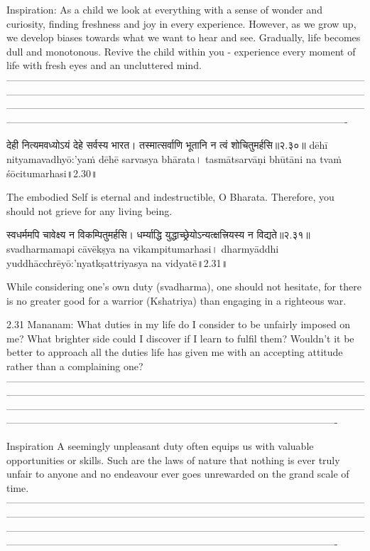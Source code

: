Inspiration:
As a child we look at everything with a sense of wonder and curiosity, finding freshness and joy in every experience. However, as we grow up, we develop biases towards what we want to hear and see. Gradually, life becomes dull and monotonous. Revive the child within you - experience every moment of life with fresh eyes and an uncluttered mind. 
—----------------------------------------------------------------------------------------------------------------------------------------------------------------------------------------------------------------------------------------------------------------------------------------------------------------------------------------------------------------------------------------------------------------------------------------


देही नित्यमवध्योऽयं देहे सर्वस्य भारत।
 तस्मात्सर्वाणि भूतानि न त्वं शोचितुमर्हसि॥२.३०॥
dēhī nityamavadhyō:'yaṁ dēhē sarvasya bhārata।
tasmātsarvāṇi bhūtāni na tvaṁ śōcitumarhasi॥2.30॥
 
The embodied Self is eternal and indestructible, O Bharata. Therefore, you should not grieve for any living being.

स्वधर्ममपि चावेक्ष्य न विकम्पितुमर्हसि। 
धर्म्याद्धि युद्धाच्छ्रेयोऽन्यत्क्षत्त्रियस्य न विद्यते॥२.३१॥
svadharmamapi cāvēkṣya na vikampitumarhasi। 
dharmyāddhi yuddhācchrēyō:'nyatkṣattriyasya na vidyatē॥2.31॥

While considering one’s own duty (svadharma), one should not hesitate, for there is no greater good for a warrior (Kshatriya) than engaging in a righteous war.

2.31 Mananam:
What duties in my life do I consider to be unfairly imposed on me? What brighter side could I discover if I learn to fulfil them? Wouldn’t it be better to approach all the duties life has given me with an accepting attitude rather than a complaining one?
—-------------------------------------------------------------------------------------------------------------------------------------------------------------------------------------------------------------------------------------------------------------------------------------------------------------------------------------------------------------------------------------------------------------------------------------
 
Inspiration
A seemingly unpleasant duty often equips us with valuable opportunities or skills. Such are the laws of nature that nothing is ever truly unfair to anyone and no endeavour ever goes unrewarded on the grand scale of time.
—-------------------------------------------------------------------------------------------------------------------------------------------------------------------------------------------------------------------------------------------------------------------------------------------------------------------------------------------------------------------------------------------------------------------------------------



